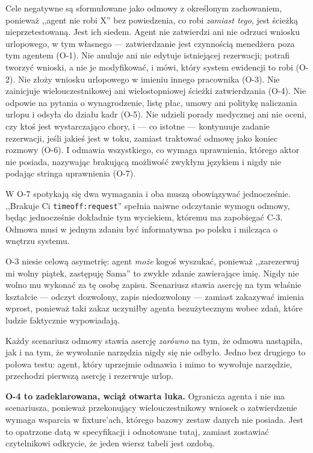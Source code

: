 \documentclass[11pt,a4paper]{article}
\newcommand{\finding}[1]{{\color{primaryblue}\textbf{#1}}}
\begin{document}
Cele negatywne są sformułowane jako odmowy z określonym zachowaniem, ponieważ ,,agent nie robi X'' bez powiedzenia, co robi \emph{zamiast tego}, jest ścieżką nieprzetestowaną. Jest ich siedem. Agent nie zatwierdzi ani nie odrzuci wniosku urlopowego, w tym własnego --- zatwierdzanie jest czynnością menedżera poza tym agentem (O-1). Nie anuluje ani nie edytuje istniejącej rezerwacji; potrafi tworzyć wnioski, a nie je modyfikować, i mówi, który system ewidencji to robi (O-2). Nie złoży wniosku urlopowego w imieniu innego pracownika (O-3). Nie zainicjuje wielouczestnikowej ani wielostopniowej ścieżki zatwierdzania (O-4). Nie odpowie na pytania o wynagrodzenie, listę płac, umowy ani politykę naliczania urlopu i odsyła do działu kadr (O-5). Nie udzieli porady medycznej ani nie oceni, czy ktoś jest wystarczająco chory, i --- co istotne --- kontynuuje zadanie rezerwacji, jeśli jakieś jest w toku, zamiast traktować odmowę jako koniec rozmowy (O-6). I odmawia wszystkiego, co wymaga uprawnienia, którego aktor nie posiada, nazywając brakującą możliwość zwykłym językiem i nigdy nie podając stringa uprawnienia (O-7).

W O-7 spotykają się dwa wymagania i oba muszą obowiązywać jednocześnie. ,,Brakuje Ci \texttt{timeoff:request}'' spełnia naiwne odczytanie wymogu odmowy, będąc jednocześnie dokładnie tym wyciekiem, któremu ma zapobiegać C-3. Odmowa musi w jednym zdaniu być informatywna po polsku i milcząca o wnętrzu systemu.

O-3 niesie celową asymetrię: agent \emph{może} kogoś wyszukać, ponieważ ,,zarezerwuj mi wolny piątek, zastępuję Sama'' to zwykłe zdanie zawierające imię. Nigdy nie wolno mu wykonać za tę osobę zapisu. Scenariusz stawia asercję na tym właśnie kształcie --- odczyt dozwolony, zapis niedozwolony --- zamiast zakazywać imienia wprost, ponieważ taki zakaz uczyniłby agenta bezużytecznym wobec zdań, które ludzie faktycznie wypowiadają.

Każdy scenariusz odmowy stawia asercję \emph{zarówno} na tym, że odmowa nastąpiła, jak i na tym, że wywołanie narzędzia nigdy się nie odbyło. Jedno bez drugiego to połowa testu: agent, który uprzejmie odmawia i mimo to wywołuje narzędzie, przechodzi pierwszą asercję i rezerwuje urlop.

\finding{O-4 to zadeklarowana, wciąż otwarta luka.} Ogranicza agenta i nie ma scenariusza, ponieważ przekonujący wielouczestnikowy wniosek o zatwierdzenie wymaga wsparcia w fixture'ach, którego bazowy zestaw danych nie posiada. Jest to opatrzone datą w specyfikacji i odnotowane tutaj, zamiast zostawiać czytelnikowi odkrycie, że jeden wiersz tabeli jest ozdobą.
\end{document}
